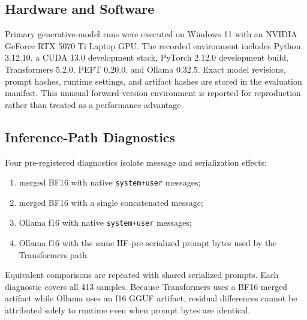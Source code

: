 \subsection{Hardware and Software}
Primary generative-model runs were executed on Windows 11 with an NVIDIA GeForce RTX 5070 Ti Laptop GPU. The recorded environment includes Python 3.12.10, a CUDA 13.0 development stack, PyTorch 2.12.0 development build, Transformers 5.2.0, PEFT 0.20.0, and Ollama 0.32.5. Exact model revisions, prompt hashes, runtime settings, and artifact hashes are stored in the evaluation manifest. This unusual forward-version environment is reported for reproduction rather than treated as a performance advantage.

\subsection{Inference-Path Diagnostics}
Four pre-registered diagnostics isolate message and serialization effects:
\begin{enumerate}
    \item merged BF16 with native \texttt{system+user} messages;
    \item merged BF16 with a single concatenated message;
    \item Ollama f16 with native \texttt{system+user} messages;
    \item Ollama f16 with the same HF-pre-serialized prompt bytes used by the Transformers path.
\end{enumerate}
Equivalent comparisons are repeated with shared serialized prompts. Each diagnostic covers all 413 samples. Because Transformers uses a BF16 merged artifact while Ollama uses an f16 GGUF artifact, residual differences cannot be attributed solely to runtime even when prompt bytes are identical.
